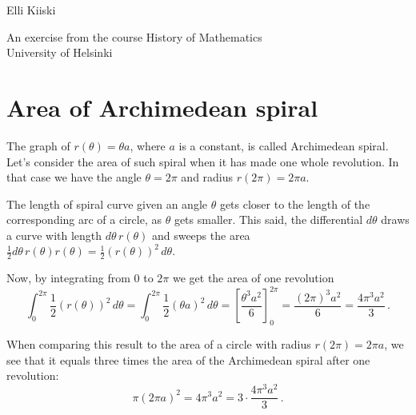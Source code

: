 \documentclass{article}
\begin{document}
{\large
Elli Kiiski
\par
An exercise from the course History of Mathematics\\University of Helsinki
}
\vspace{0.5cm}

\section*{Area of Archimedean spiral}

The graph of $r(\theta)=\theta a$, where $a$ is a constant, is called Archimedean spiral. Let's consider the area of such spiral when it has made one whole revolution. In that case we have the angle $\theta=2\pi$ and radius $r(2\pi)=2\pi a$.

The length of spiral curve given an angle $\theta$ gets closer to the length of the corresponding arc of a circle, as $\theta$ gets smaller. This said, the differential $d\theta$ draws a curve with length $d\theta \,r(\theta)$ and sweeps the area $\frac{1}{2} d\theta\,r(\theta)r(\theta) = \frac{1}{2}(r(\theta))^2\,d\theta$.

Now, by integrating from $0$ to $2\pi$ we get the area of one revolution
\begin{equation*}
    \int_0^{2\pi} \frac{1}{2}(r(\theta))^2\,d\theta = \int_0^{2\pi} \frac{1}{2} (\theta a)^2\,d\theta = \left[\frac{\theta^3 a^2}{6}\right]_0^{2\pi} = \frac{(2\pi)^3 a^2}{6} = \frac{4\pi^3 a^2}{3}\,.
\end{equation*}

When comparing this result to the area of a circle with radius $r(2\pi)=2\pi a$, we see that it equals three times the area of the Archimedean spiral after one revolution:
\begin{equation*}
    \pi(2\pi a)^2 = 4\pi^3 a^2 = 3 \cdot \frac{4\pi^3 a^2}{3}\,.
\end{equation*}
\end{document}

